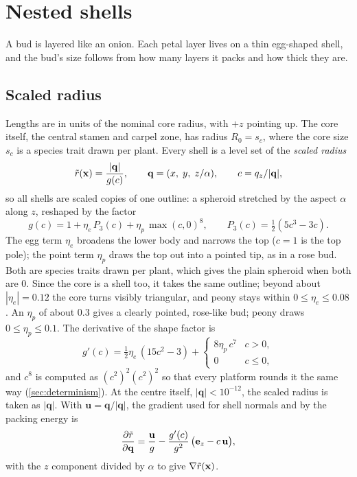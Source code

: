 \section{Nested shells}\label{sec:shells}

A bud is layered like an onion. Each petal layer lives on a thin egg-shaped
shell, and the bud's size follows from how many layers it packs and how thick
they are.

\subsection{Scaled radius}
Lengths are in units of the nominal core radius, with $+z$ pointing up. The
core itself, the central stamen and carpel zone, has radius $R_0 = s_c$, where
the core size $s_c$ is a species trait drawn per plant. Every shell is a level
set of the \emph{scaled radius}
\[
  \tilde r(\mathbf{x}) = \frac{|\mathbf q|}{g(c)}, \qquad
  \mathbf q = (x,\; y,\; z/\alpha), \qquad c = q_z / |\mathbf q|,
\]
so all shells are scaled copies of one outline: a spheroid stretched by the
aspect $\alpha$ along $z$, reshaped by the factor
\[
  g(c) = 1 + \eta_e\,P_3(c) + \eta_p\,\max(c, 0)^8, \qquad P_3(c) = \tfrac12(5c^3 - 3c).
\]
The egg term $\eta_e$ broadens the lower body and narrows the top ($c = 1$ is the
top pole); the point term $\eta_p$ draws the top out into a pointed tip, as in a
rose bud. Both are species traits drawn per plant, which gives the
plain spheroid when both are 0. Since the core is a shell too, it takes the
same outline; beyond about $|\eta_e| = 0.12$ the core turns visibly
triangular, and peony stays within $0 \le \eta_e \le 0.08$. An $\eta_p$ of about
0.3 gives a clearly pointed, rose-like bud; peony draws $0 \le \eta_p \le 0.1$.
The derivative of the shape factor is
\[
  g'(c) = \tfrac12\eta_e\,(15c^2 - 3) + \begin{cases} 8\eta_p\,c^7 & c > 0,\\ 0 & c \le 0,\end{cases}
\]
and $c^8$ is computed as $(c^2)^2(c^2)^2$ so that every platform rounds it the
same way (\cref{sec:determinism}). At the centre itself, $|\mathbf q| <
10^{-12}$, the scaled radius is taken as $|\mathbf q|$. With
$\mathbf u = \mathbf q/|\mathbf q|$, the gradient used for shell normals and by
the packing energy is
\[
  \frac{\partial\tilde r}{\partial\mathbf q} = \frac{\mathbf u}{g} - \frac{g'(c)}{g^2}\,\bigl(\mathbf e_z - c\,\mathbf u\bigr),
\]
with the $z$ component divided by $\alpha$ to give $\nabla\tilde r(\mathbf{x})$.

